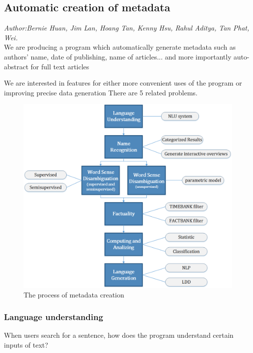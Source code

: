 %  
% 
% 

\subsection{Automatic creation of metadata}
\textit{\footnotesize Author:Bernie Huan, Jim Lan, Hoang Tan, Kenny Hsu, Rahul Aditya, Tan Phat, Wei.}\\

We are producing a program which automatically generate metadata such as authors' name, date of publishing, name of articles... and more importantly auto-abstract for full text articles

We are interested in features for either more convenient uses of the program or improving precise data generation
There are 5 related problems.

\begin{figure}
	\caption{The process of metadata creation}
\begin{center}
	\includegraphics[width=\columnwidth]{UnionChart}
\end{center}
\end{figure}

\subsubsection*{Language understanding}
When users search for a sentence, how does the program understand certain inputs of text? 

